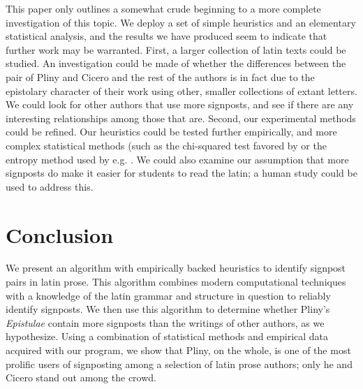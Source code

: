 This paper only outlines a somewhat crude beginning to a more complete investigation of this topic. We deploy a set of simple heuristics and an elementary statistical analysis, and the results we have produced seem to indicate that further work may be warranted. First, a larger collection of latin texts could be studied. An investigation could be made of whether the differences between the pair of Pliny and Cicero and the rest of the authors is in fact due to the epistolary character of their work using other, smaller collections of extant letters. We could look for other authors that use more signposts, and see if there are any interesting relationships among those that are. Second, our experimental methods could be refined. Our heuristics could be tested further empirically, and more complex statistical methods (such as the chi-squared test favored by \cite{chi2} or the entropy method used by e.g. \cite{software}. We could also examine our assumption that more signposts do make it easier for students to read the latin; a human study could be used to address this.

\section{Conclusion}
\label{sec:conclusion}

We present an algorithm with empirically backed heuristics to identify signpost pairs in latin prose. This algorithm combines modern computational techniques with a knowledge of the latin grammar and structure in question to reliably identify signposts. We then use this algorithm to determine whether Pliny's \textit{Epistulae} contain more signposts than the writings of other authors, as we hypothesize. Using a combination of statistical methods and empirical data acquired with our program, we show that Pliny, on the whole, is one of the most prolific users of signposting among a selection of latin prose authors; only he and Cicero stand out among the crowd.
